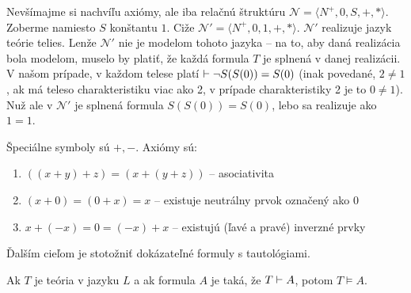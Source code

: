 \begin{poznamka}
    Nevšímajme si nachvíľu axiómy, ale iba relačnú štruktúru
    $\mathcal{N}=\langle N^+,0,S,+,* \rangle$.
    Zoberme namiesto $S$ konštantu $1$.
    Ciže $\mathcal{N}'=\langle N^+,0,1,+,* \rangle$.
    $\mathcal{N}'$ realizuje jazyk teórie telies.
    Lenže $\mathcal{N}'$ nie je modelom tohoto jazyka --
    na to, aby daná realizácia bola modelom, muselo by platiť, že
    každá formula $T$ je splnená v danej realizácii. V našom prípade,
    v každom telese platí $\vdash \neg S(S(0))=S(0)$ (inak
    povedané, $2 \ne 1$, ak má teleso charakteristiku viac ako 2,
    v prípade charakteristiky 2 je to $0 \ne 1$). Nuž ale v 
    $\mathcal{N}'$ je splnená formula $S(S(0))=S(0)$, lebo sa
    realizuje ako $1=1$.
\end{poznamka}

\begin{priklad}
    Špeciálne symboly sú $+,-$.
    Axiómy sú:
    \begin{enumerate}
            \item $((x+y)+z) = (x+(y+z))$ -- asociativita
            \item $(x+0) = (0+x) = x$ -- existuje neutrálny prvok
            označený ako 0
            \item $x+(-x) = 0 = (-x)+x$ -- existujú (ľavé a pravé) inverzné
            prvky
    \end{enumerate}
\end{priklad}

Ďalším cieľom je stotožniť dokázateľné formuly s tautológiami.
\stopFIXME

\begin{veta}[O korektnosti]
    Ak $T$ je teória v jazyku $L$ a ak formula $A$ je taká,
    že $T \vdash A$, potom $T \models A$.
\end{veta}

